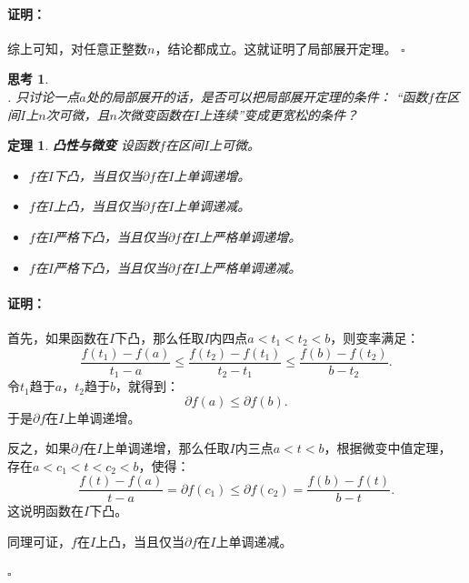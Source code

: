 \documentclass[12pt,UTF8]{ctexbook}
\renewenvironment{proof}{\paragraph{\textbf{证明：}}}{\hfill$\square$}
\newtheorem{tm}{定理}[section]
\newtheorem{sk}{思考}[section]
\begin{document}
\begin{appendix}
\begin{proof}
    综上可知，对任意正整数$n$，结论都成立。这就证明了局部展开定理。
\end{proof}

\begin{sk}
    \mbox{} \\
    . 只讨论一点$a$处的局部展开的话，是否可以把局部展开定理的条件：
    “函数$f$在区间$I$上$n$次可微，且$n$次微变函数在$I$上连续”变成更宽松的条件？\\
\end{sk}

\begin{tm}{\textbf{凸性与微变}}
    设函数$f$在区间$I$上可微。
    \begin{itemize}
        \item $f$在$I$下凸，当且仅当$\partial f$在$I$上单调递增。
        \item $f$在$I$上凸，当且仅当$\partial f$在$I$上单调递减。
        \item $f$在$I$严格下凸，当且仅当$\partial f$在$I$上严格单调递增。
        \item $f$在$I$严格下凸，当且仅当$\partial f$在$I$上严格单调递减。
    \end{itemize}
\end{tm}

\begin{proof}
    首先，如果函数在$I$下凸，那么任取$I$内四点$a < t_1 < t_2 < b$，则变率满足：
    $$ \frac{f(t_1) - f(a)}{t_1 - a} \leqslant \frac{f(t_2) - f(t_1)}{t_2 - t_1} \leqslant \frac{f(b) - f(t_2)}{b - t_2}. $$
    令$t_1$趋于$a$，$t_2$趋于$b$，就得到：
    $$ \partial f(a) \leqslant \partial f(b).$$
    于是$\partial f$在$I$上单调递增。

    反之，如果$\partial f$在$I$上单调递增，那么任取$I$内三点$a < t < b$，根据微变中值定理，
    存在$a < c_1 < t < c_2 < b$，使得：
    $$ \frac{f(t) - f(a)}{t - a} = \partial f(c_1) \leqslant  \partial f(c_2) = \frac{f(b) - f(t)}{b - t}. $$
    这说明函数在$I$下凸。

    同理可证，$f$在$I$上凸，当且仅当$\partial f$在$I$上单调递减。


\end{proof}
\end{appendix}
\end{document}

